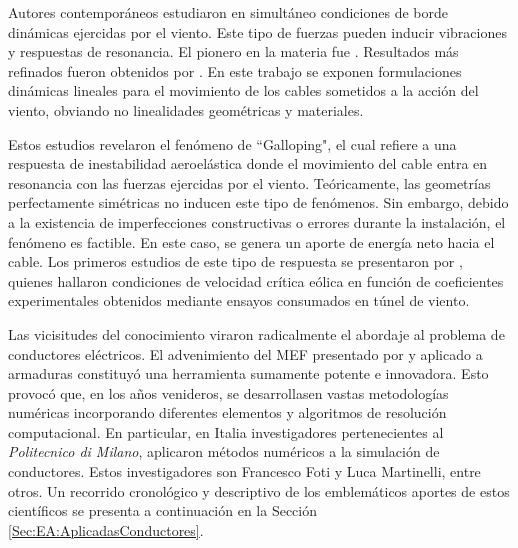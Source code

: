 Autores contemporáneos estudiaron en simultáneo condiciones de borde dinámicas ejercidas por el viento. Este tipo de fuerzas pueden inducir vibraciones y respuestas de resonancia. El pionero en la materia fue \cite{Davenport1965}. Resultados más refinados fueron obtenidos por \cite{Starossek1991}. En este trabajo se exponen formulaciones dinámicas lineales para el movimiento de los cables sometidos a la acción del viento, obviando no linealidades geométricas y materiales. 

Estos estudios revelaron el fenómeno de ``Galloping", el cual refiere a una respuesta de inestabilidad aeroelástica donde el movimiento del cable entra en resonancia con las fuerzas ejercidas por el viento. Teóricamente, las geometrías perfectamente simétricas no inducen este tipo de fenómenos. Sin embargo, debido a la existencia de imperfecciones constructivas o errores durante la instalación, el fenómeno es factible. En este caso, se genera un aporte de energía neto hacia el cable. Los primeros estudios de este tipo de respuesta se presentaron por \cite{Simiu1986}, quienes hallaron condiciones de velocidad crítica eólica en función de coeficientes experimentales obtenidos mediante ensayos consumados en túnel de viento. 

Las vicisitudes del conocimiento viraron radicalmente el abordaje al problema de conductores eléctricos. El advenimiento del \gls{MEF} presentado por \cite{zienkiewicz1970finite} y aplicado a armaduras constituyó una herramienta sumamente potente e innovadora. Esto provocó que, en los años venideros, se desarrollasen vastas metodologías numéricas incorporando diferentes elementos y algoritmos de resolución computacional. En particular, en Italia investigadores pertenecientes al \emph{Politecnico di Milano}, aplicaron métodos numéricos a la simulación de conductores. Estos investigadores son Francesco Foti y Luca Martinelli, entre otros. Un recorrido cronológico y descriptivo de los emblemáticos aportes de estos científicos se presenta a continuación en la Sección \ref{Sec:EA:AplicadasConductores}.

